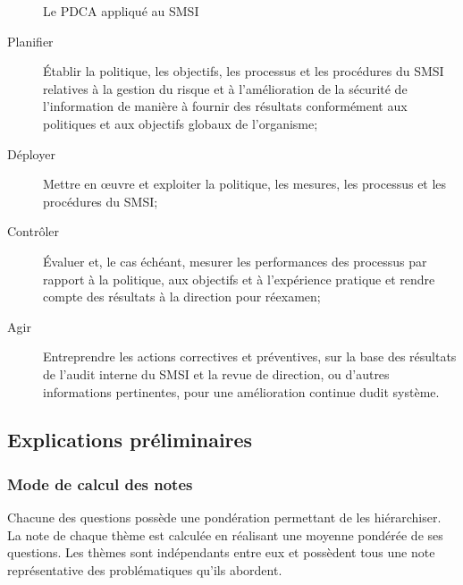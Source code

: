 \begin{figure}[ht]
\begin{center}
	\end{center}
	\caption{Le PDCA appliqué au SMSI}
\end{figure}

\begin{description}
	\item[Planifier] \'Etablir la politique, les objectifs, les processus et les procédures du SMSI relatives à la gestion du risque et à l'amélioration de la sécurité de l'information de manière à fournir des résultats conformément aux politiques et aux objectifs globaux de l'organisme;
	\item[Déployer] Mettre en \oe{}uvre et exploiter la politique, les mesures, les processus et les procédures du SMSI;
	\item[Contrôler] \'Evaluer et, le cas échéant, mesurer les performances des processus par rapport à la politique, aux objectifs et à l'expérience pratique et rendre compte des résultats à la direction pour réexamen;
	\item[Agir] Entreprendre les actions correctives et préventives, sur la base des résultats de l'audit interne du SMSI et la revue de direction, ou d'autres informations pertinentes, pour une amélioration continue dudit système.
\end{description}

\subsection{Explications préliminaires}

\subsubsection{Mode de calcul des notes}

Chacune des questions possède une pondération permettant de les hiérarchiser. La note de chaque thème est calculée en réalisant une moyenne pondérée de ses questions. Les thèmes sont indépendants entre eux et possèdent tous une note représentative des problématiques qu'ils abordent.

